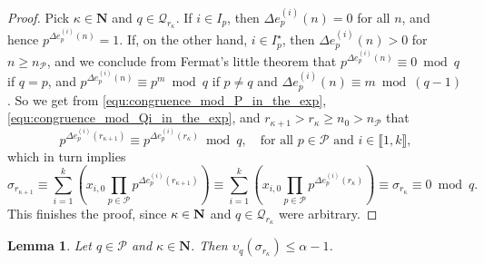 \documentclass[reqno]{amsart}
\newtheorem{lemma}{Lemma}
\theoremstyle{remark}
\providecommand{\NNb}{\mathbf{N}}
\providecommand{\PPc}{\mathcal{P}}
\providecommand\llb{\llbracket}
\providecommand\rrb{\rrbracket}
\begin{document}
\begin{proof}%
Pick $\kappa \in \NNb$ and $q \in \mathcal Q_{r_\kappa}$.
If $i \in I_p$, then $\Delta e_p^{(i)}(n) = 0$ for all $n$, and hence $p^{\Delta e_p^{(i)}(n)} = 1$. If, on the other hand, $i \in I_p^\star$, then $\Delta e_p^{(i)}(n) > 0$ for $n \ge n_\PPc$, and we conclude from Fermat's little theorem that $p^{\Delta e_p^{(i)}(n)} \equiv 0 \bmod q$ if $q = p$, and $p^{\Delta e_p^{(i)}(n)} \equiv p^m \bmod q$ if $p \ne q$ and $\Delta e_p^{(i)}(n) \equiv m \bmod (q-1)$. So we get from \eqref{equ:congruence_mod_P_in_the_exp}, \eqref{equ:congruence_mod_Qi_in_the_exp}, and $r_{\kappa+1} > r_{\kappa} \ge n_0 > n_\PPc$ that
%
$$
p^{\Delta e_p^{(i)}(r_{\kappa+1})} \equiv p^{\Delta e_p^{(i)}(r_\kappa)} \bmod q,\quad\text{for all }p \in \PPc\text{ and }i \in \llb 1, k \rrb,
$$
%
which in turn implies
$$
\sigma_{r_{\kappa+1}} \equiv \sum_{i=1}^k \!\left(x_{i,0} \prod_{p \in \mathcal{P}} p^{\Delta e_p^{(i)}(r_{\kappa+1})}\right)\! \equiv \sum_{i=1}^k \!\left(x_{i,0} \prod_{p \in \mathcal{P}} p^{\Delta e_p^{(i)}(r_\kappa)}\right)\! \equiv \sigma_{r_\kappa} \equiv 0 \bmod q.
$$
This finishes the proof, since $\kappa\in {\bf N}$ and $q\in {\mathcal Q}_{r_{\kappa}}$ were arbitrary.
\end{proof}
%
\begin{lemma}
\label{lem:3}
Let $q \in \PPc$ and $\kappa \in \NNb$. Then $\upsilon_q(\sigma_{r_\kappa}) \le \alpha - 1$.
\end{lemma}
%
\end{document}
